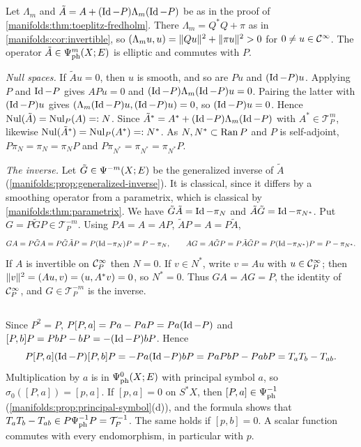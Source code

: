 \subsection*{}
Let $\Lambda_m$ and $\tilde A=A+(\operatorname{Id}-P)\Lambda_m(\operatorname{Id}-P)$ be as in the proof of
\cref{manifolds:thm:toeplitz-fredholm}. There $\Lambda_m=Q^*Q+\pi$ as in
\cref{manifolds:cor:invertible}, so $( \Lambda_mu, u)=\lVert Qu\rVert^2+\lVert \pi u\rVert^2>0$ for
$0\ne u\in\mathcal{C}^\infty$. The operator $\tilde A\in\Psi^{m}_{\mathrm{ph}}(X;E)$ is elliptic and commutes
with $P$.

\emph{Null spaces.} If $\tilde Au=0$, then $u$ is smooth, and so are $Pu$ and $(\operatorname{Id}-P)u$. Applying
$P$ and $\operatorname{Id}-P$ gives $APu=0$ and $(\operatorname{Id}-P)\Lambda_m(\operatorname{Id}-P)u=0$. Pairing the latter with
$(\operatorname{Id}-P)u$ gives $( \Lambda_m(\operatorname{Id}-P)u, (\operatorname{Id}-P)u)=0$, so $(\operatorname{Id}-P)u=0$. Hence
$\operatorname{Nul}(\tilde A)=\operatorname{Nul}_P(A)=:N$. Since $\tilde A^*=A^*+(\operatorname{Id}-P)\Lambda_m(\operatorname{Id}-P)$ with
$A^*\in\mathcal T^m_P$, likewise $\operatorname{Nul}(\tilde A^*)=\operatorname{Nul}_P(A^*)=:N^*$. As $N,N^*\subset\operatorname{Ran} P$ and $P$
is self-adjoint, $P\pi_N=\pi_N=\pi_NP$ and $P\pi_{N^*}=\pi_{N^*}=\pi_{N^*}P$.

\emph{The inverse.} Let $\tilde G\in\Psi^{-m}(X;E)$ be the generalized inverse of $\tilde A$
(\cref{manifolds:prop:generalized-inverse}). It is classical, since it differs by a smoothing
operator from a parametrix, which is classical by \cref{manifolds:thm:parametrix}. We have
$\tilde G\tilde A=\operatorname{Id}-\pi_N$ and $\tilde A\tilde G=\operatorname{Id}-\pi_{N^*}$. Put $G=P\tilde GP\in\mathcal T^{-m}_P$. Using
$PA=A=AP$, $\tilde AP=A=P\tilde A$,
\begin{equation*}
GA=P\tilde GA=P\tilde G\tilde AP=P(\operatorname{Id}-\pi_N)P=P-\pi_N,\qquad
AG=A\tilde GP=P\tilde A\tilde GP=P(\operatorname{Id}-\pi_{N^*})P=P-\pi_{N^*}.
\end{equation*}
If $A$ is invertible on $\mathcal{C}^\infty_P$ then $N=0$. If $v\in N^*$, write $v=Au$ with $u\in\mathcal{C}^\infty_P$; then
$\lVert v\rVert^2=( Au, v)=( u, A^*v)=0$, so $N^*=0$. Thus $GA=AG=P$, the identity of
$\mathcal{C}^\infty_P$, and $G\in\mathcal T^{-m}_P$ is the inverse.

\subsection*{}
Since $P^2=P$, $P[P,a]=Pa-PaP=Pa(\operatorname{Id}-P)$ and $[P,b]P=PbP-bP=-(\operatorname{Id}-P)bP$. Hence
\begin{equation*}
P[P,a](\operatorname{Id}-P)[P,b]P=-Pa(\operatorname{Id}-P)bP=PaPbP-PabP=T_aT_b-T_{ab}.
\end{equation*}
Multiplication by $a$ is in $\Psi^{0}_{\mathrm{ph}}(X;E)$ with principal symbol $a$, so
$\sigma_0([P,a])=[p,a]$. If $[p,a]=0$ on $S^*X$, then $[P,a]\in\Psi^{-1}_{\mathrm{ph}}$
(\cref{manifolds:prop:principal-symbol}(d)), and the formula shows that
$T_aT_b-T_{ab}\in P\Psi^{-1}_{\mathrm{ph}}P=\mathcal T^{-1}_P$. The same holds if $[p,b]=0$. A scalar
function commutes with every endomorphism, in particular with $p$.

